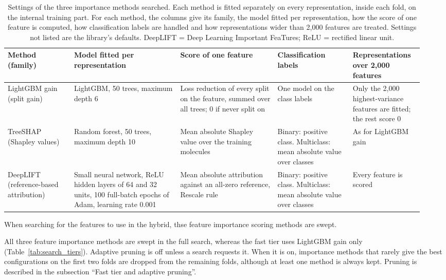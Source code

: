 \begin{table}[htbp]
\centering
\caption[Settings of the three importance methods searched.]{Settings of the three importance methods searched. Each method is fitted separately on every representation, inside each fold, on the internal training part. For each method, the columns give its family, the model fitted per representation, how the score of one feature is computed, how classification labels are handled and how representations wider than 2{,}000 features are treated. Settings not listed are the library's defaults. DeepLIFT = Deep Learning Important FeaTures; ReLU = rectified linear unit.}
\label{tab:importance_methods}
\small
\begin{adjustbox}{max width=\textwidth}
\begin{tabular}{@{}P{0.15\linewidth}P{0.24\linewidth}P{0.22\linewidth}P{0.17\linewidth}P{0.16\linewidth}@{}}
\toprule
Method (family) & Model fitted per representation & Score of one feature & Classification labels & Representations over 2{,}000 features \\
\midrule
LightGBM gain (split gain) & LightGBM, 50 trees, maximum depth 6 & Loss reduction of every split on the feature, summed over all trees; 0 if never split on & One model on the class labels & Only the 2{,}000 highest-variance features are fitted; the rest score 0 \\
TreeSHAP (Shapley values) & Random forest, 50 trees, maximum depth 10 & Mean absolute Shapley value over the training molecules & Binary: positive class. Multiclass: mean absolute value over classes & As for LightGBM gain \\
DeepLIFT (reference-based attribution) & Small neural network, ReLU hidden layers of 64 and 32 units, 100 full-batch epochs of Adam, learning rate 0.001 & Mean absolute attribution against an all-zero reference, Rescale rule & Binary: positive class. Multiclass: mean absolute value over classes & Every feature is scored \\
\bottomrule
\end{tabular}
\end{adjustbox}
\end{table}

When searching for the features to use in the hybrid, thse feature importance scoring methods are swept.

All three feature importance methods are swept in the full search, whereas the fast tier uses LightGBM gain only (Table~\ref{tab:search_tiers}). Adaptive pruning is off unless a search requests it. When it is on, importance methods that rarely give the best configurations on the first two folds are dropped from the remaining folds, although at least one method is always kept. Pruning is described in the subsection ``Fast tier and adaptive pruning''.

